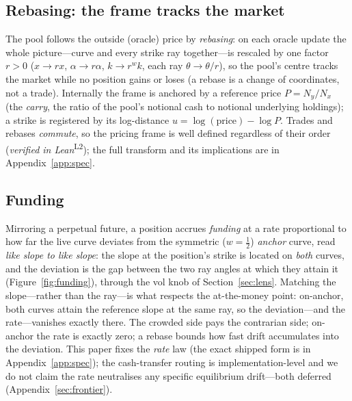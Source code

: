 \documentclass[runningheads]{llncs}
\newcommand{\tfp}{\emph{verified in Lean}}
\begin{document}
\subsection{Rebasing: the frame tracks the market}
The pool follows the outside (oracle) price by \emph{rebasing}: on each oracle
update the whole picture---curve and every strike ray together---is rescaled by
one factor $r>0$ ($x\to rx$, $\alpha\to r\alpha$, $k\to r^{w}k$, each ray
$\theta\to\theta/r$), so the pool's centre tracks the market while no
position gains or loses (a rebase is a change of coordinates, not a trade).
Internally the frame is anchored by a reference price $P=N_{y}/N_{x}$ (the
\emph{carry}, the ratio of the pool's notional cash to notional underlying
holdings); a strike is registered by its log-distance
$u=\log(\text{price})-\log P$. Trades and rebases \emph{commute}, so the
pricing frame is well defined regardless of their order
(\tfp{}\textsuperscript{L2}); the full transform and its implications are in
Appendix~\ref{app:spec}.

\subsection{Funding}\label{sec:funding}
Mirroring a perpetual future, a position accrues \emph{funding} at a rate
proportional to how far the live curve deviates from the symmetric
($w=\tfrac12$) \emph{anchor} curve, read \emph{like slope to like slope}:
the slope at the position's strike is located on \emph{both} curves, and the
deviation is the gap between the two ray angles at which they attain it
(Figure~\ref{fig:funding}), through the vol knob of Section~\ref{sec:lens}.
Matching the slope---rather than the ray---is what respects the at-the-money
point: on-anchor, both curves attain the reference slope at the same ray, so
the deviation---and the rate---vanishes exactly there. The crowded side pays the contrarian side; on-anchor
the rate is exactly zero; a rebase bounds how fast drift accumulates into the
deviation. This paper fixes the \emph{rate} law (the exact shipped form is in
Appendix~\ref{app:spec}); the cash-transfer routing is implementation-level
and we do not claim the rate neutralises any specific equilibrium drift---both
deferred (Appendix~\ref{sec:frontier}).
\end{document}
